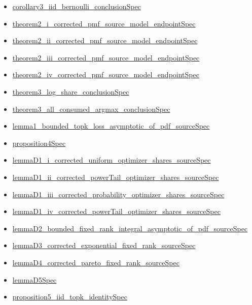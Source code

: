 \documentclass[10pt]{article}
\begin{document}
\begin{itemize}[leftmargin=1.2em]
\begin{itemize}[leftmargin=1.2em]
\item \hyperlink{source-claim-f61ea0b8a68fcc23}{corollary3\_iid\_bernoulli\_conclusionSpec}
\item \hyperlink{source-claim-04c6588920268e32}{theorem2\_i\_corrected\_pmf\_source\_model\_endpointSpec}
\item \hyperlink{source-claim-6ff5481408fce970}{theorem2\_ii\_corrected\_pmf\_source\_model\_endpointSpec}
\item \hyperlink{source-claim-3057a09badb30d45}{theorem2\_iii\_corrected\_pmf\_source\_model\_endpointSpec}
\item \hyperlink{source-claim-49b00f2a87213781}{theorem2\_iv\_corrected\_pmf\_source\_model\_endpointSpec}
\item \hyperlink{source-claim-149ee4bef168eff6}{theorem3\_log\_share\_conclusionSpec}
\item \hyperlink{source-claim-a9a6608e74ff7dd3}{theorem3\_all\_consumed\_argmax\_conclusionSpec}
\item \hyperlink{source-claim-e8b459af037ff529}{lemma1\_bounded\_topk\_loss\_asymptotic\_of\_pdf\_sourceSpec}
\item \hyperlink{source-claim-28a8fb49d83f5d5a}{proposition4Spec}
\item \hyperlink{source-claim-fa631b15a4a1176a}{lemmaD1\_i\_corrected\_uniform\_optimizer\_shares\_sourceSpec}
\item \hyperlink{source-claim-f95d0c81ab1b47f3}{lemmaD1\_ii\_corrected\_powerTail\_optimizer\_shares\_sourceSpec}
\item \hyperlink{source-claim-3f921e813126282a}{lemmaD1\_iii\_corrected\_probability\_optimizer\_shares\_sourceSpec}
\item \hyperlink{source-claim-30cff96f226dc581}{lemmaD1\_iv\_corrected\_powerTail\_optimizer\_shares\_sourceSpec}
\item \hyperlink{source-claim-7237c50e8bcf2059}{lemmaD2\_bounded\_fixed\_rank\_integral\_asymptotic\_of\_pdf\_sourceSpec}
\item \hyperlink{source-claim-dcffa0731fd7e8dc}{lemmaD3\_corrected\_exponential\_fixed\_rank\_sourceSpec}
\item \hyperlink{source-claim-49105a2b2538ba9d}{lemmaD4\_corrected\_pareto\_fixed\_rank\_sourceSpec}
\item \hyperlink{source-claim-477ea495052a0969}{lemmaD5Spec}
\item \hyperlink{source-claim-4a13a0b223d63917}{proposition5\_iid\_topk\_identitySpec}
\end{itemize}
\end{itemize}
\end{document}
